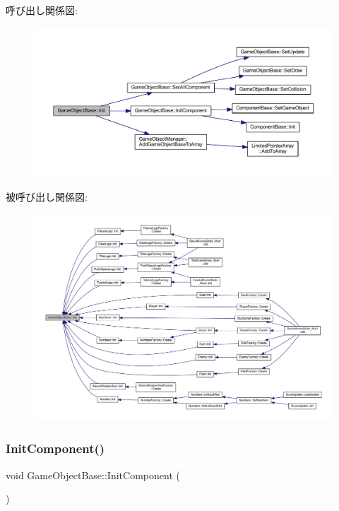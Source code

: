 呼び出し関係図\+:\nopagebreak
\begin{figure}[H]
\begin{center}
\leavevmode
\includegraphics[width=350pt]{class_game_object_base_aca14cf5d66f945347653c4965876e75b_cgraph}
\end{center}
\end{figure}
被呼び出し関係図\+:\nopagebreak
\begin{figure}[H]
\begin{center}
\leavevmode
\includegraphics[width=350pt]{class_game_object_base_aca14cf5d66f945347653c4965876e75b_icgraph}
\end{center}
\end{figure}
\mbox{\label{class_game_object_base_a5f4d4e3d23603d8e32ddb220a53039a6}} 
\subsubsection{\texorpdfstring{Init\+Component()}{InitComponent()}}
{\footnotesize\ttfamily void Game\+Object\+Base\+::\+Init\+Component (\begin{DoxyParamCaption}{ }\end{DoxyParamCaption})\hspace{0.3cm}{\ttfamily [private]}}



